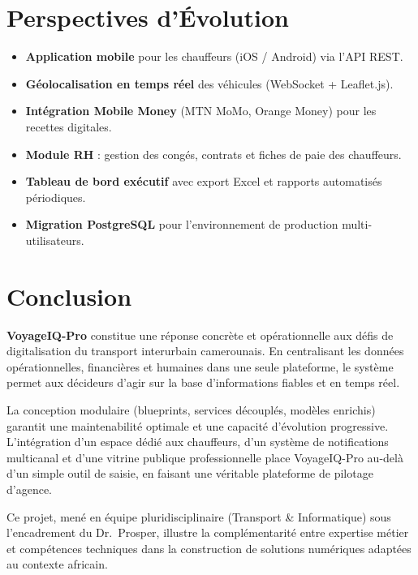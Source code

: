 \documentclass[12pt,a4paper]{report}
\begin{document}
\chapter{Perspectives d'Évolution}

\begin{itemize}[leftmargin=1.5cm]
    \item \textbf{Application mobile} pour les chauffeurs (iOS / Android) via l'API REST.
    \item \textbf{Géolocalisation en temps réel} des véhicules (WebSocket + Leaflet.js).
    \item \textbf{Intégration Mobile Money} (MTN MoMo, Orange Money) pour les recettes digitales.
    \item \textbf{Module RH} : gestion des congés, contrats et fiches de paie des chauffeurs.
    \item \textbf{Tableau de bord exécutif} avec export Excel et rapports automatisés périodiques.
    \item \textbf{Migration PostgreSQL} pour l'environnement de production multi-utilisateurs.
\end{itemize}

\chapter{Conclusion}

\textbf{VoyageIQ-Pro} constitue une réponse concrète et opérationnelle aux défis
de digitalisation du transport interurbain camerounais. En centralisant les données
opérationnelles, financières et humaines dans une seule plateforme, le système
permet aux décideurs d'agir sur la base d'informations fiables et en temps réel.

La conception modulaire (blueprints, services découplés, modèles enrichis) garantit
une maintenabilité optimale et une capacité d'évolution progressive. L'intégration
d'un espace dédié aux chauffeurs, d'un système de notifications multicanal et d'une
vitrine publique professionnelle place VoyageIQ-Pro au-delà d'un simple outil de
saisie, en faisant une véritable plateforme de pilotage d'agence.

Ce projet, mené en équipe pluridisciplinaire (Transport \& Informatique) sous
l'encadrement du Dr.~Prosper, illustre la complémentarité entre expertise métier
et compétences techniques dans la construction de solutions numériques adaptées
au contexte africain.
\end{document}
